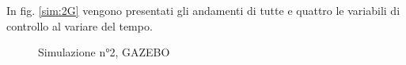 \documentclass[a4paper,10pt]{article}
\begin{document}
In fig. \ref{sim:2G} vengono presentati gli andamenti di tutte e quattro le variabili di controllo al variare del tempo.

\begin{figure}
\centering
{}
\caption{Simulazione n°2, GAZEBO}
\label{sim:2xyz_G}
\end{figure}
\end{document}
